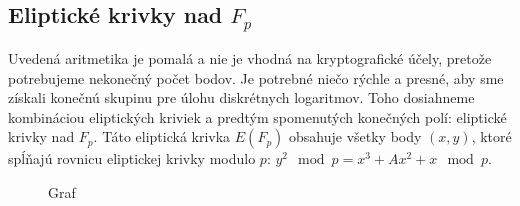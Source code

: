 \subsection{Eliptické krivky nad \( F_p \)}

Uvedená aritmetika je pomalá a nie je vhodná na kryptografické účely, pretože potrebujeme nekonečný počet bodov. Je potrebné niečo rýchle a presné, aby sme získali konečnú skupinu pre úlohu diskrétnych logaritmov. Toho dosiahneme kombináciou eliptických kriviek a predtým spomenutých konečných polí: eliptické krivky nad \( F_p \). Táto eliptická krivka \( E(F_p) \) obsahuje všetky body \((x, y)\), ktoré spĺňajú rovnicu eliptickej krivky modulo \( p \): \( y^2 \mod p = x^3 + Ax^2 + x \mod p \). 

\begin{figure}[h]
	\centering
	\caption{Graf}
	\label{fig:elliptic_curve}
\end{figure}